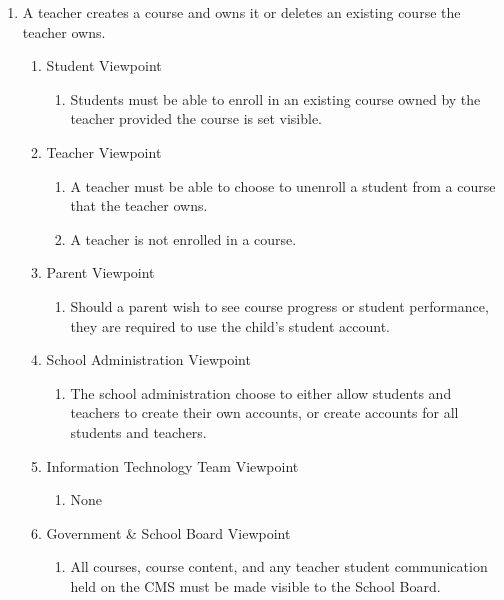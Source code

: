 \documentclass[]{article}
\begin{document}



\begin{enumerate}[{BE}1.]
	\item A teacher creates a course and owns it or deletes an existing course the teacher owns.
	\begin{enumerate}[{VP1}.1]
		\item Student Viewpoint
			\begin{enumerate}
				\item Students must be able to enroll in an existing course owned by the teacher provided the course is set visible.
			\end{enumerate}
		\item Teacher Viewpoint
			\begin{enumerate}
				\item A teacher must be able to choose to unenroll a student from a course that the teacher owns.
				\item A teacher is not enrolled in a course.
			\end{enumerate}
		\item Parent Viewpoint
			\begin{enumerate}
				\item \*\*\*\*\* Should a parent wish to see course progress or student performance, they are required to use the child's student account.
			\end{enumerate}
		\item School Administration Viewpoint
			\begin{enumerate}
				\item The school administration  choose to either allow students and teachers to create their own accounts, or create accounts for all students and teachers.
			\end{enumerate}
		\item Information Technology Team Viewpoint
			\begin{enumerate}
				\item None
			\end{enumerate}
		\item Government \& School Board Viewpoint
			\begin{enumerate}
				\item All courses, course content, and any teacher student communication
held on the CMS must be made visible to the School Board.
			\end{enumerate}
	\end{enumerate}


\end{enumerate}
\end{document}
